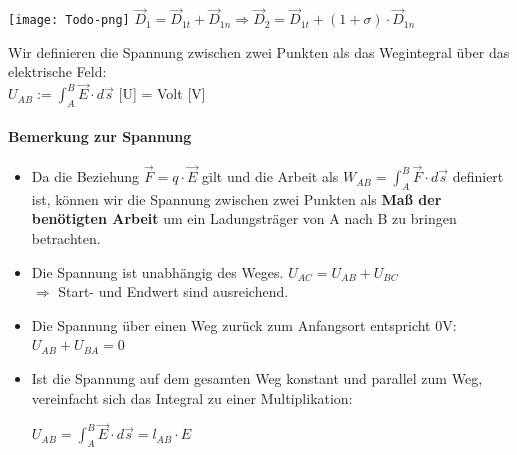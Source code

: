 						\texttt{[image: Todo-png]}
						\formulaBegin
						$\vec{D}_1 = \vec{D}_{1t} + \vec{D}_{1n} \Rightarrow \vec{D}_2 = \vec{D}_{1t} + (1 + \sigma) \cdot \vec{D}_{1n}$
						\formulaEnd
					\iend


					 \beginip
						Wir definieren die Spannung zwischen zwei Punkten als das Wegintegral über das elektrische Feld: \\
						\formulaBegin
						$ U_{AB} :=  \int_A^B \vec{E} \cdot d\vec{s} $
						\formulaEnd
						{[U]} = Volt {[V]}
					\iend

					\paragraph{Bemerkung zur Spannung}

				\begin{itemize}

					\item	Da die Beziehung $\vec{F} =  q \cdot \vec{E} $ gilt und die Arbeit als $ W_{AB} = \int_A^B \vec{F} \cdot d\vec{s}$ definiert ist, können wir die Spannung zwischen zwei Punkten als \textbf{Maß der benötigten Arbeit} um ein Ladungsträger von A nach B zu bringen betrachten.  \\
						\item Die Spannung ist unabhängig des Weges.  $U_{AC} = U_{AB} + U_{BC}$
						\\ $\Rightarrow$ Start- und Endwert sind ausreichend. \\
						\item Die Spannung über einen Weg zurück zum Anfangsort entspricht 0V: $U_{AB} + U_{BA} = 0$ \\
						\item Ist die Spannung auf dem gesamten Weg konstant und parallel zum Weg, vereinfacht sich das Integral zu einer Multiplikation: \\
						\begin{center}
							$ U_{AB} = \int_{A}^{B} \vec{E}\cdot d\vec{s} = l_{AB} \cdot E$
						\end{center}
					\end{itemize}




